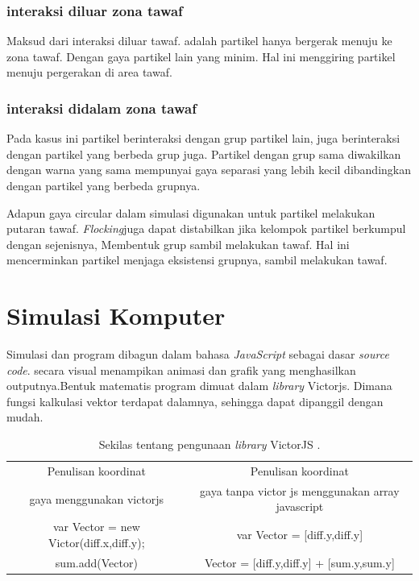\subsubsection{interaksi diluar zona tawaf}
\hspace{0.6cm} Maksud dari interaksi diluar tawaf. adalah partikel hanya bergerak menuju ke zona tawaf. Dengan gaya partikel lain yang minim. Hal ini menggiring partikel menuju pergerakan di area tawaf.

\subsubsection{interaksi didalam zona tawaf}
\hspace{0.6cm} Pada kasus ini partikel berinteraksi dengan grup partikel lain, juga berinteraksi dengan partikel yang berbeda grup juga. Partikel dengan grup sama diwakilkan dengan warna yang sama mempunyai gaya separasi yang lebih kecil dibandingkan dengan partikel yang berbeda grupnya. 

Adapun gaya circular dalam simulasi digunakan untuk partikel melakukan putaran tawaf. \emph{Flocking}juga dapat distabilkan jika kelompok partikel berkumpul dengan sejenisnya, Membentuk grup sambil melakukan tawaf. Hal ini mencerminkan partikel menjaga eksistensi grupnya, sambil melakukan tawaf.

\section{Simulasi Komputer}
\hspace{0.6cm}Simulasi dan program dibagun dalam bahasa \emph{JavaScript} sebagai dasar \emph{source code}. secara visual menampikan animasi dan grafik yang menghasilkan outputnya.Bentuk matematis program dimuat dalam \emph{library} Victorjs. Dimana fungsi kalkulasi vektor terdapat dalamnya, sehingga dapat dipanggil dengan mudah.

\begin{table}
\centering
\caption{Sekilas tentang pengunaan \emph{library} VictorJS .}
\begin{center}
\begin{tabular}{|c|c|}
\hline
Penulisan koordinat  & Penulisan koordinat\\
gaya menggunakan victorjs &  gaya tanpa victor js menggunakan array javascript\\
\hline
var Vector = new Victor(diff.x,diff.y); & var Vector = [diff.y,diff.y] \\
\hline
\hline
sum.add(Vector) & Vector = [diff.y,diff.y] + [sum.y,sum.y]  \\
\hline
\end{tabular}
\end{center}
\end{table}

